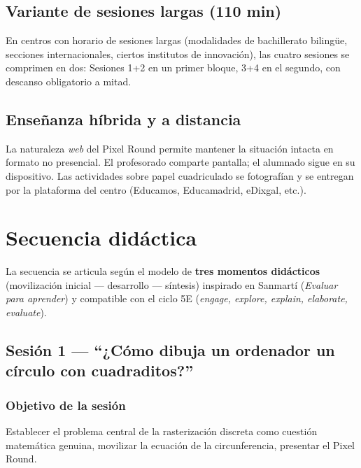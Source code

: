 \documentclass[12pt,a4paper]{scrartcl}
\newcommand{\acc}[1]{\textcolor{accent}{\textbf{#1}}}
\begin{document}
\subsection{Variante de sesiones largas (110 min)}
En centros con horario de sesiones largas (modalidades de bachillerato bilingüe, secciones internacionales, ciertos institutos de innovación), las cuatro sesiones se comprimen en dos: Sesiones 1+2 en un primer bloque, 3+4 en el segundo, con descanso obligatorio a mitad.

\subsection{Enseñanza híbrida y a distancia}
La naturaleza \emph{web} del Pixel Round permite mantener la situación intacta en formato no presencial. El profesorado comparte pantalla; el alumnado sigue en su dispositivo. Las actividades sobre papel cuadriculado se fotografían y se entregan por la plataforma del centro (Educamos, Educamadrid, eDixgal, etc.).

\section{Secuencia didáctica}

La secuencia se articula según el modelo de \acc{tres momentos didácticos} (movilización inicial --- desarrollo --- síntesis) inspirado en Sanmartí (\emph{Evaluar para aprender}) y compatible con el ciclo 5E (\emph{engage, explore, explain, elaborate, evaluate}).

\subsection{Sesión 1 --- ``¿Cómo dibuja un ordenador un círculo con cuadraditos?''}\label{sesion1}

\subsubsection*{Objetivo de la sesión}
Establecer el problema central de la rasterización discreta como cuestión matemática genuina, movilizar la ecuación de la circunferencia, presentar el Pixel Round.

\medskip
\end{document}
